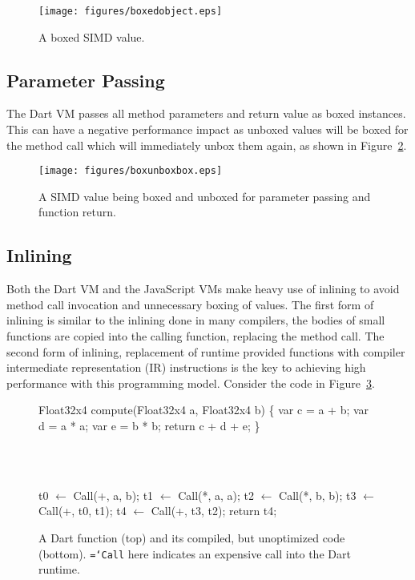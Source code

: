 \documentclass[preprint]{sigplanconf}
\newcommand{\ttt}[1]{{\texttt{\hyphenchar\font=`\-\relax #1}}}%
\begin{document}
\begin{figure}
\begin{center}
\texttt{[image: figures/boxedobject.eps]}
\end{center}
\caption{A boxed SIMD value.}
\label{fig:boxedobject}
\end{figure}

\subsection{Parameter Passing}

The Dart VM passes all method parameters and return value as boxed
instances. This can have a negative performance impact as unboxed values will be
boxed for the method call which will immediately unbox them again, as shown in
Figure~\ref{fig:boxunboxbox}.

\begin{figure}
\begin{center}
\texttt{[image: figures/boxunboxbox.eps]}
\end{center}
\caption{A SIMD value being boxed and unboxed for parameter passing and
function return.}
\label{fig:boxunboxbox}
\end{figure}

\subsection{Inlining}
\label{inlining}

Both the Dart VM and the JavaScript VMs make heavy use of inlining to avoid
method call invocation and unnecessary boxing of values. The first form of
inlining is similar to the inlining done in many compilers, the bodies of small
functions are copied into the calling function, replacing the method call. The
second form of inlining, replacement of runtime provided functions with compiler
intermediate representation (IR) instructions is the key to achieving high
performance with this programming model. Consider the code in
Figure~\ref{fig:unoptimized}.

\begin{figure}
\begin{small}
\begin{program}[style=tt, number=true]
Fl\tab{}oat32x4 compute(Float32x4 a, Float32x4 b) \{
  var c = a + b;
  var d = a * a;
  var e = b *  b;
  return c + d + e;\untab{}
\}
\end{program}
\end{small}
\ \ \\ \ \ \\
\begin{small}
\begin{program}[style=tt, number=true]
t0 $\leftarrow$ Call(+, a, b);
t1 $\leftarrow$ Call(*, a, a);
t2 $\leftarrow$ Call(*, b, b);
t3 $\leftarrow$ Call(+, t0, t1);
t4 $\leftarrow$ Call(+, t3, t2);
return t4;
\end{program}
\end{small}
\caption{A Dart function (top) and its compiled, but unoptimized code
(bottom). \ttt{Call} here indicates an expensive call into the Dart runtime.}
\label{fig:unoptimized}
\end{figure}
\end{document}

